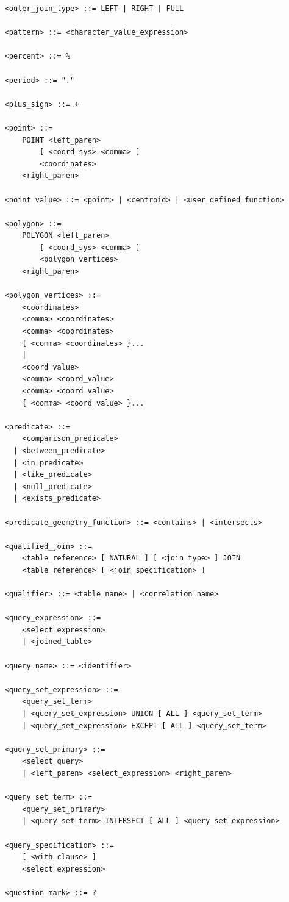 \documentclass[11pt,a4paper]{ivoa}
\begin{document}
\begin{verbatim}
    <outer_join_type> ::= LEFT | RIGHT | FULL

    <pattern> ::= <character_value_expression>

    <percent> ::= %

    <period> ::= "."

    <plus_sign> ::= +

    <point> ::=
        POINT <left_paren>
            [ <coord_sys> <comma> ]
            <coordinates>
        <right_paren>

    <point_value> ::= <point> | <centroid> | <user_defined_function>

    <polygon> ::=
        POLYGON <left_paren>
            [ <coord_sys> <comma> ]
            <polygon_vertices>
        <right_paren>
    
    <polygon_vertices> ::=
        <coordinates>
        <comma> <coordinates>
        <comma> <coordinates>
        { <comma> <coordinates> }...
        |
        <coord_value>
        <comma> <coord_value>
        <comma> <coord_value>
        { <comma> <coord_value> }...

    <predicate> ::=
        <comparison_predicate>
      | <between_predicate>
      | <in_predicate>
      | <like_predicate>
      | <null_predicate>
      | <exists_predicate>

    <predicate_geometry_function> ::= <contains> | <intersects>

    <qualified_join> ::=
        <table_reference> [ NATURAL ] [ <join_type> ] JOIN
        <table_reference> [ <join_specification> ]

    <qualifier> ::= <table_name> | <correlation_name>

    <query_expression> ::=
        <select_expression>
        | <joined_table>

    <query_name> ::= <identifier>

    <query_set_expression> ::=
        <query_set_term>
        | <query_set_expression> UNION [ ALL ] <query_set_term>
        | <query_set_expression> EXCEPT [ ALL ] <query_set_term>

    <query_set_primary> ::=
        <select_query>
        | <left_paren> <select_expression> <right_paren>

    <query_set_term> ::=
        <query_set_primary>
        | <query_set_term> INTERSECT [ ALL ] <query_set_expression>

    <query_specification> ::=
        [ <with_clause> ]
        <select_expression>

    <question_mark> ::= ?


\end{verbatim}
\end{document}

